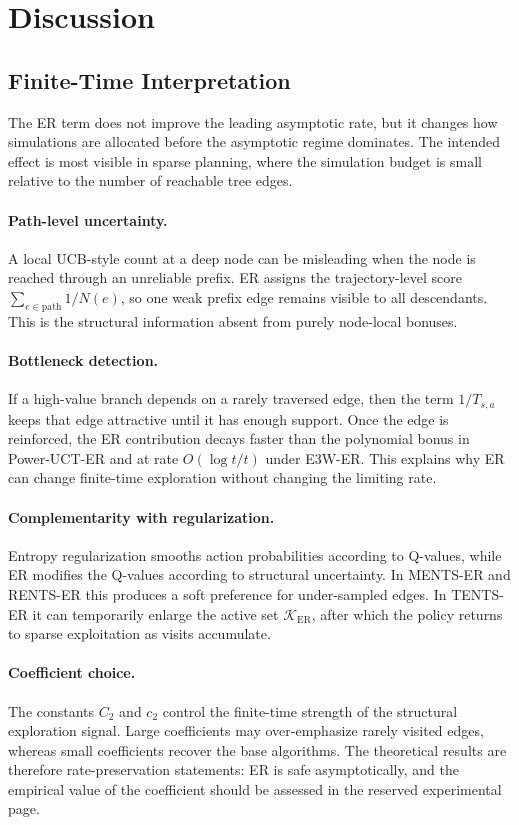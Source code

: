 \documentclass{article}
\begin{document}
\section{Discussion}
\label{sec:main_discussion}
\subsection{Finite-Time Interpretation}
\label{sec:main_finite_time}
The ER term does not improve the leading asymptotic rate, but it changes how simulations are allocated before the asymptotic regime dominates.  The intended effect is most visible in sparse planning, where the simulation budget is small relative to the number of reachable tree edges.

\paragraph{Path-level uncertainty.}
A local UCB-style count at a deep node can be misleading when the node is reached through an unreliable prefix.  ER assigns the trajectory-level score $\sum_{e\in\mathrm{path}}1/N(e)$, so one weak prefix edge remains visible to all descendants.  This is the structural information absent from purely node-local bonuses.

\paragraph{Bottleneck detection.}
If a high-value branch depends on a rarely traversed edge, then the term $1/T_{s,a}$ keeps that edge attractive until it has enough support.  Once the edge is reinforced, the ER contribution decays faster than the polynomial bonus in Power-UCT-ER and at rate $O(\log t/t)$ under E3W-ER.  This explains why ER can change finite-time exploration without changing the limiting rate.

\paragraph{Complementarity with regularization.}
Entropy regularization smooths action probabilities according to Q-values, while ER modifies the Q-values according to structural uncertainty.  In MENTS-ER and RENTS-ER this produces a soft preference for under-sampled edges.  In TENTS-ER it can temporarily enlarge the active set $\mathcal K_{\mathrm{ER}}$, after which the policy returns to sparse exploitation as visits accumulate.

\paragraph{Coefficient choice.}
The constants $C_2$ and $c_2$ control the finite-time strength of the structural exploration signal.  Large coefficients may over-emphasize rarely visited edges, whereas small coefficients recover the base algorithms.  The theoretical results are therefore rate-preservation statements: ER is safe asymptotically, and the empirical value of the coefficient should be assessed in the reserved experimental page.
\end{document}

